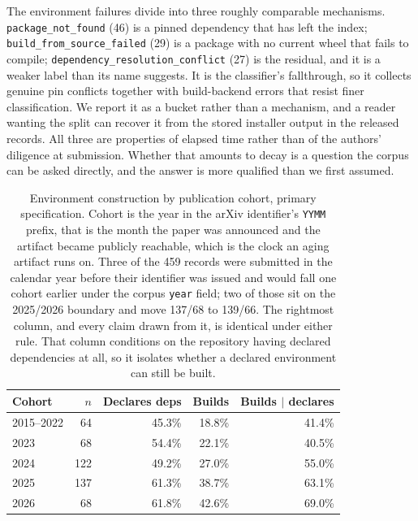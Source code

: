 The environment failures divide into three roughly comparable mechanisms.
\texttt{package\_not\_found} (46) is a pinned dependency that has left the index;
\texttt{build\_\allowbreak from\_\allowbreak source\_\allowbreak failed} (29) is a
package with no current wheel that fails to compile;
\texttt{dependency\_\allowbreak resolution\_\allowbreak conflict} (27) is the
residual, and it is a weaker label than its name suggests. It is the classifier's
fallthrough, so it collects genuine pin conflicts together with build-backend
errors that resist finer classification. We report it as a bucket rather than a
mechanism, and a reader wanting the split can recover it from the stored
installer output in the released records. All three are properties of elapsed
time rather than of the authors' diligence at submission. Whether that amounts to
decay is a question the corpus can be asked directly, and the answer is more
qualified than we first assumed.

\begin{table}[H]
\centering
\caption{Environment construction by publication cohort, primary specification.
Cohort is the year in the arXiv identifier's \texttt{YYMM} prefix, that is the
month the paper was announced and the artifact became publicly reachable, which
is the clock an aging artifact runs on. Three of the 459 records were submitted
in the calendar year before their identifier was issued and would fall one
cohort earlier under the corpus \texttt{year} field; two of those sit on the
2025/2026 boundary and move 137/68 to 139/66. The rightmost column, and every
claim drawn from it, is identical under either rule. That column conditions on
the repository having declared dependencies at all, so it isolates whether a
declared environment can still be built.}
\label{tab:cohort}
\small
\begin{tabular}{@{}lrrrr@{}}
\toprule
Cohort & $n$ & Declares deps & Builds & Builds $\mid$ declares \\
\midrule
2015--2022 & 64  & 45.3\% & 18.8\% & 41.4\% \\
2023       & 68  & 54.4\% & 22.1\% & 40.5\% \\
2024       & 122 & 49.2\% & 27.0\% & 55.0\% \\
2025       & 137 & 61.3\% & 38.7\% & 63.1\% \\
2026       & 68  & 61.8\% & 42.6\% & 69.0\% \\
\bottomrule
\end{tabular}
\end{table}

